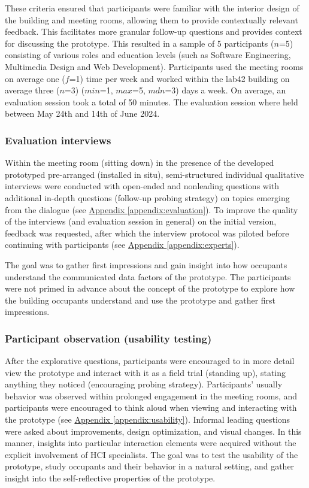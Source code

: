 These criteria ensured that participants were familiar with the interior design of the building and meeting rooms, allowing them to provide contextually relevant feedback. This facilitates more granular follow-up questions and provides context for discussing the prototype. This resulted in a sample of 5 participants ($n$=5) consisting of various roles and education levels (such as Software Engineering, Multimedia Design and Web Development). Participants used the meeting rooms on average one ($f$=1) time per week and worked within the lab42 building on average three ($n$=3) ($min$=1, $max$=5, $mdn$=3) days a week. On average, an evaluation session took a total of 50 minutes. The evaluation session where held between May 24th and 14th of June 2024. 

\subsubsection{Evaluation interviews}

Within the meeting room (sitting down) in the presence of the developed prototyped pre-arranged (installed in situ), semi-structured individual qualitative interviews were conducted with open-ended and nonleading questions with additional in-depth questions (follow-up probing strategy) on topics emerging from the dialogue (see \hyperref[appendix:evaluation]{Appendix \ref*{appendix:evaluation}}). To improve the quality of the interviews (and evaluation session in general) on the initial version, feedback was requested, after which the interview protocol was piloted before continuing with participants (see \hyperref[appendix:experts]{Appendix \ref*{appendix:experts}}). 

The goal was to gather first impressions and gain insight into how occupants understand the communicated data factors of the prototype. The participants were not primed in advance about the concept of the prototype to explore how the building occupants understand and use the prototype and gather first impressions.

\subsubsection{Participant observation (usability testing)}

After the explorative questions, participants were encouraged to in more detail view the prototype and interact with it as a field trial (standing up), stating anything they noticed (encouraging probing strategy). Participants' usually behavior was observed within prolonged engagement in the meeting rooms, and participants were encouraged to think aloud when viewing and interacting with the prototype (see \hyperref[appendix:usability]{Appendix \ref*{appendix:usability}}). Informal leading questions were asked about improvements, design optimization, and visual changes. In this manner, insights into particular interaction elements were acquired without the explicit involvement of HCI specialists. The goal was to test the usability of the prototype, study occupants and their behavior in a natural setting, and gather insight into the self-reflective properties of the prototype. 

